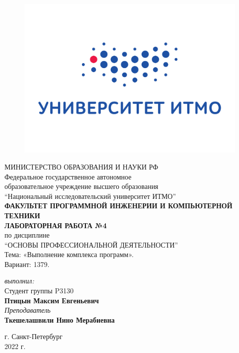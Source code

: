 \begin{center}

	\begin{figure}[H]
	\centering
	\includegraphics[scale=0.3]{img/logo}
	\end{figure}
	\hfill \break
	МИНИСТЕРСТВО ОБРАЗОВАНИЯ И НАУКИ РФ\\
	\hfill \break
	Федеральное государственное автономное\\
	образовательное учреждение высшего образования\\
	``Национальный исследовательский университет ИТМО''\\
	\hfill \break
	\textbf{ФАКУЛЬТЕТ ПРОГРАММНОЙ ИНЖЕНЕРИИ И КОМПЬЮТЕРНОЙ ТЕХНИКИ}\\
	\vspace{3cm}
	\large{\textbf{ЛАБОРАТОРНАЯ РАБОТА №4}}\\
	\hfill \break
	по дисциплине\\
	\large{``ОСНОВЫ ПРОФЕССИОНАЛЬНОЙ ДЕЯТЕЛЬНОСТИ''}\\
	Тема: «Выполнение комплекса программ».\\
	\hfill \break
	Вариант: 1379.
	\vspace{5cm}
	\begin{flushright}
	\textit{выполнил:}\\
	Студент группы P3130\\
	\textbf{Птицын Максим Евгеньевич}\\
	\textit{Преподаватель}\\
	\textbf{Ткешелашвили Нино Мерабиевна}
	\end{flushright}
\end{center}

\vfill


\begin{center} г. Санкт-Петербург\\2022 г.
\end{center}

\thispagestyle{empty}
\newpage